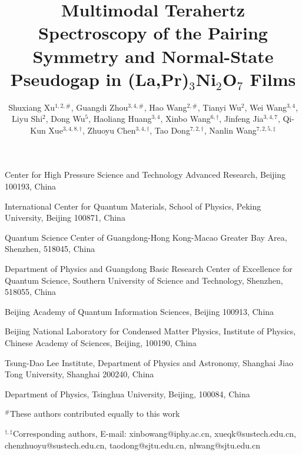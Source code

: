\documentclass{nature}
\title{Multimodal Terahertz Spectroscopy of the Pairing Symmetry and Normal-State Pseudogap in (La,Pr)$_3$Ni$_2$O$_7$ Films }
\newcommand{\hpstar}{Center for High Pressure Science and Technology Advanced Research, Beijing 100193, China}
\newcommand{\tsung}{Tsung-Dao Lee Institute, Department of Physics and Astronomy, Shanghai Jiao Tong University, Shanghai 200240, China}
\newcommand{\bayarea}{Quantum Science Center of Guangdong-Hong Kong-Macao Greater Bay Area, Shenzhen, 518045, China}
\newcommand{\sust}{Department of Physics and Guangdong Basic Research Center of Excellence for Quantum Science, Southern University of Science and Technology, Shenzhen, 518055, China}
\newcommand{\pku}{International Center for Quantum Materials, School of Physics, Peking University, Beijing 100871, China}
\newcommand{\baqis}{Beijing Academy of Quantum Information Sciences, Beijing 100913, China}
\newcommand{\iop}{Beijing National Laboratory for Condensed Matter Physics, Institute of Physics, Chinese Academy of Sciences, Beijing, 100190, China}
\newcommand{\tsing}{Department of Physics, Tsinghua University, Beijing, 100084, China}
\begin{document}
\maketitle



\author{Shuxiang Xu$^{1, 2,\text{\#}}$, Guangdi Zhou$^{3, 4,\text{\#}}$, Hao Wang$^{2,\text{\#}}$, Tianyi Wu$^{2}$, Wei Wang$^{3,4}$, Liyu Shi$^{2}$, Dong Wu$^{5}$, Haoliang Huang$^{3, 4}$, Xinbo Wang$^{6,\dagger}$, Jinfeng Jia$^{3,4,7}$, Qi-Kun Xue$^{3,4,8,\dagger}$, Zhuoyu Chen$^{3,4,\dagger}$, Tao Dong$^{7,2,\dagger}$, Nanlin Wang$^{7,2,5,\ddag}$}

\begin{affiliations}
	
	\item \hpstar %
	\item \pku %
	\item \bayarea %
	\item \sust %
	\item \baqis %
	\item \iop %
    \item \tsung %
	\item \tsing %
	 
	 $^{\text{\#}}$These authors contributed equally to this work
	  
	 $^{\dagger,\ddag}$Corresponding authors, E-mail: xinbowang@iphy.ac.cn, xueqk@sustech.edu.cn,
	 chenzhuoyu@sustech.edu.cn, taodong@sjtu.edu.cn, nlwang@sjtu.edu.cn
	 
\end{affiliations}
 


\clearpage

\setlength{\parskip}{4pt}
\end{document}
